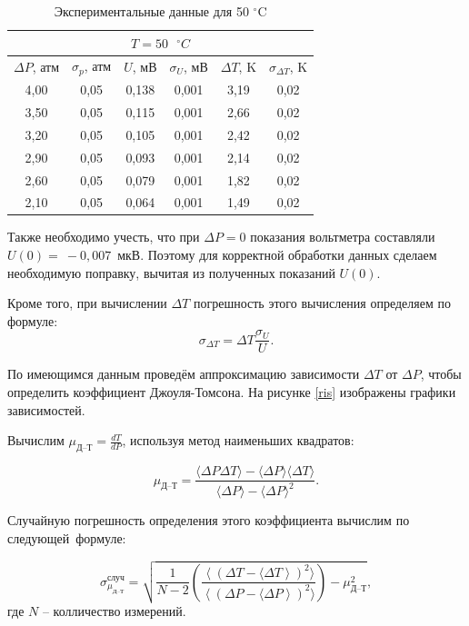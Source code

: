\documentclass[a4paper,12pt]{article} %
\begin{document}
\begin{table}[H]
	\centering
	\begin{tabular}{|c|c|c|c|c|c|}
		\hline
		\multicolumn{6}{|c|}{$ T = 50 \text{ } ^\circ C $} \\ \hline
		$ \Delta P $, атм & $ \sigma_p $, атм & $ U $, мВ & $ \sigma_U $, мВ & $ \Delta T $, K & $ \sigma_{\Delta T} $, K \\ \hline
		4,00 & 0,05 & 0,138 & 0,001 & 3,19 & 0,02 \\ \hline
		3,50 & 0,05 & 0,115 & 0,001 & 2,66 & 0,02 \\ \hline
		3,20 & 0,05 & 0,105 & 0,001 & 2,42 & 0,02 \\ \hline
		2,90 & 0,05 & 0,093 & 0,001 & 2,14 & 0,02 \\ \hline
		2,60 & 0,05 & 0,079 & 0,001 & 1,82 & 0,02 \\ \hline
		2,10 & 0,05 & 0,064 & 0,001 & 1,49 & 0,02 \\ \hline
	\end{tabular}
	\caption{Экспериментальные данные для 50 $^\circ$C}
	\label{tab:50C}
\end{table}

Также необходимо учесть, что при $ \Delta P = 0$ показания вольтметра составляли $ U(0) =~-0,007 $~мкВ. Поэтому для корректной обработки данных сделаем необходимую поправку, вычитая из полученных показаний $ U(0) $.

Кроме того, при вычислении $ \Delta T $ погрешность этого вычисления определяем по формуле: \[ \sigma_{\Delta T} = \Delta T \frac{\sigma_U}{U}. \]

По имеющимся данным проведём аппроксимацию зависимости $ \Delta T $ от $ \Delta P $, чтобы определить коэффициент Джоуля-Томсона. На рисунке \ref{ris} изображены графики зависимостей.



Вычислим $ \mu_\text{Д--Т} = \frac{dT}{dP} $, используя метод наименьших квадратов:

\[ \mu_\text{Д--Т} = \frac{\langle \Delta P \Delta T \rangle - \langle \Delta P \rangle \langle \Delta T \rangle}{\langle \Delta P \rangle - \langle \Delta P \rangle ^2}.\]

Случайную погрешность определения этого коэффициента вычислим по следующей~формуле:

\[ \sigma^\text{случ}_{\mu_\text{Д--Т}} = \sqrt{\frac{1}{N-2} \left(\frac{\left\langle\left(\Delta T - \langle \Delta T\right\rangle\right)^2 \rangle}{\left\langle\left(\Delta P - \langle \Delta P\right\rangle\right)^2 \rangle}\right)-\mu_\text{Д--Т}^2},\] где  $ N $  -- колличество измерений.
\end{document}
